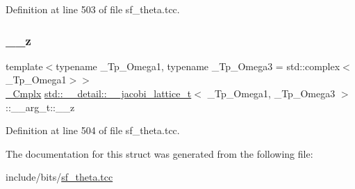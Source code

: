 Definition at line 503 of file sf\+\_\+theta.\+tcc.

\mbox{\label{structstd_1_1____detail_1_1____jacobi__lattice__t_1_1____arg__t_a1d6bd69438f1be3c303c018cb2a8677a}} 
\subsubsection{\texorpdfstring{\+\_\+\+\_\+z}{\_\_z}}
{\footnotesize\ttfamily template$<$typename \+\_\+\+Tp\+\_\+\+Omega1, typename \+\_\+\+Tp\+\_\+\+Omega3 = std\+::complex$<$\+\_\+\+Tp\+\_\+\+Omega1$>$$>$ \\
\hyperlink{structstd_1_1____detail_1_1____jacobi__lattice__t_a77e286c37544d6ba5e4fb5542d3aad5f}{\+\_\+\+Cmplx} \hyperlink{structstd_1_1____detail_1_1____jacobi__lattice__t}{std\+::\+\_\+\+\_\+detail\+::\+\_\+\+\_\+jacobi\+\_\+lattice\+\_\+t}$<$ \+\_\+\+Tp\+\_\+\+Omega1, \+\_\+\+Tp\+\_\+\+Omega3 $>$\+::\+\_\+\+\_\+arg\+\_\+t\+::\+\_\+\+\_\+z}



Definition at line 504 of file sf\+\_\+theta.\+tcc.



The documentation for this struct was generated from the following file\+:\begin{DoxyCompactItemize}
\item 
include/bits/\hyperlink{sf__theta_8tcc}{sf\+\_\+theta.\+tcc}\end{DoxyCompactItemize}
